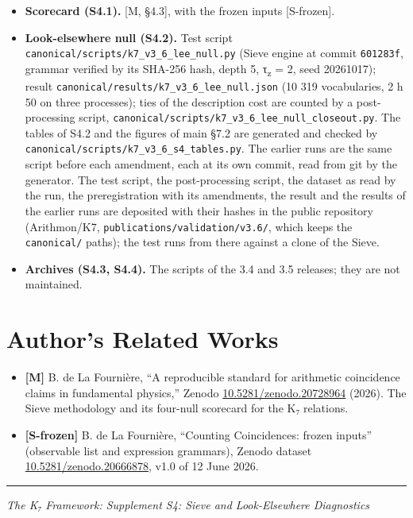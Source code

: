 \documentclass[11pt,a4paper]{article}
\begin{document}
\begin{itemize}
\tightlist
\item
  \textbf{Scorecard (S4.1).} {[}M, §4.3{]}, with the frozen inputs {[}S-frozen{]}.
\item
  \textbf{Look-elsewhere null (S4.2).} Test script \texttt{canonical/\allowbreak{}scripts/\allowbreak{}k7\_\allowbreak{}v3\_\allowbreak{}6\_\allowbreak{}lee\_\allowbreak{}null.\allowbreak{}py} (Sieve engine at commit \texttt{601283f}, grammar verified by its SHA-256 hash, depth 5, τ\textsubscript{z} = 2, seed 20261017); result \texttt{canonical/\allowbreak{}results/\allowbreak{}k7\_\allowbreak{}v3\_\allowbreak{}6\_\allowbreak{}lee\_\allowbreak{}null.\allowbreak{}json} (10 319 vocabularies, 2 h 50 on three processes); ties of the description cost are counted by a post-processing script, \texttt{canonical/\allowbreak{}scripts/\allowbreak{}k7\_\allowbreak{}v3\_\allowbreak{}6\_\allowbreak{}lee\_\allowbreak{}null\_\allowbreak{}closeout.\allowbreak{}py}. The tables of S4.2 and the figures of main §7.2 are generated and checked by \texttt{canonical/\allowbreak{}scripts/\allowbreak{}k7\_\allowbreak{}v3\_\allowbreak{}6\_\allowbreak{}s4\_\allowbreak{}tables.\allowbreak{}py}. The earlier runs are the same script before each amendment, each at its own commit, read from git by the generator. The test script, the post-processing script, the dataset as read by the run, the preregistration with its amendments, the result and the results of the earlier runs are deposited with their hashes in the public repository (Arithmon/K7, \texttt{publications/\allowbreak{}validation/\allowbreak{}v3.\allowbreak{}6/\allowbreak{}}, which keeps the \texttt{canonical/\allowbreak{}} paths); the test runs from there against a clone of the Sieve.
\item
  \textbf{Archives (S4.3, S4.4).} The scripts of the 3.4 and 3.5 releases; they are not maintained.
\end{itemize}

\section{Author's Related Works}\label{authors-related-works}

\begin{itemize}
\tightlist
\item
  \textbf{{[}M{]}} B. de La Fournière, ``A reproducible standard for arithmetic coincidence claims in fundamental physics,'' Zenodo \href{https://doi.org/10.5281/zenodo.20728964}{10.5281/zenodo.20728964} (2026). The Sieve methodology and its four-null scorecard for the K₇ relations.
\item
  \textbf{{[}S-frozen{]}} B. de La Fournière, ``Counting Coincidences: frozen inputs'' (observable list and expression grammars), Zenodo dataset \href{https://doi.org/10.5281/zenodo.20666878}{10.5281/zenodo.20666878}, v1.0 of 12 June 2026.
\end{itemize}

\begin{center}\rule{\linewidth}{0.5pt}\end{center}

\emph{The K₇ Framework: Supplement S4: Sieve and Look-Elsewhere Diagnostics}


\bigskip

\end{document}
